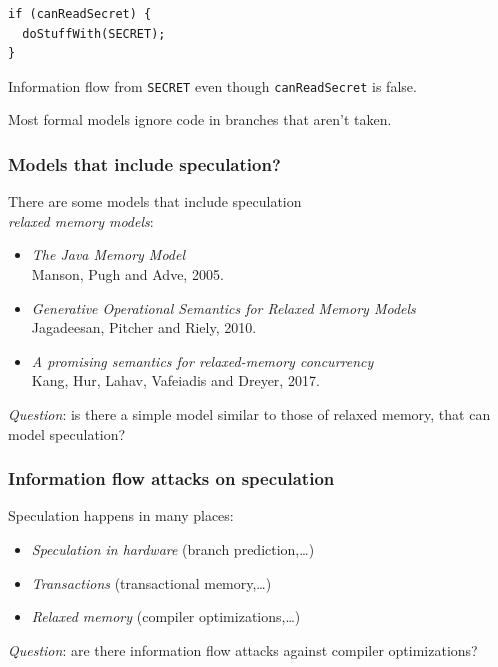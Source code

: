 \documentclass{beamer}
\begin{document}
\begin{frame}[fragile]
\begin{minipage}[b]{.45\textwidth}
\begin{verbatim}
if (canReadSecret) {
  doStuffWith(SECRET);
}
\end{verbatim}

    Information flow from \verb|SECRET|
    even though \verb|canReadSecret| is false.
    \bigskip

    Most formal models ignore code in branches
    that aren't taken.

    \bigskip
  \end{minipage}
\end{frame}

\begin{frame}
  \frametitle{Models that include speculation?}

  There are some models that include speculation\\
  \emph{relaxed memory models}:

  \begin{itemize}\footnotesize
  \item \emph{The Java Memory Model}\\
    Manson, Pugh and Adve, 2005.
  \item \emph{Generative Operational Semantics for Relaxed Memory Models}\\
    Jagadeesan, Pitcher and Riely, 2010.
  \item \emph{A promising semantics for relaxed-memory concurrency}\\
    Kang, Hur, Lahav, Vafeiadis and Dreyer, 2017.
  \end{itemize}

  \pause
  \emph{Question}: is there a simple model similar to
  those of relaxed memory, that can model speculation?
\end{frame}

\begin{frame}
  \frametitle{Information flow attacks on speculation}
  Speculation happens in many places:
  \begin{itemize}\footnotesize
  \item \emph{Speculation in hardware} (branch prediction,\ldots) \\
  \item \emph{Transactions} (transactional memory,\ldots)\\
  \item \emph{Relaxed memory} (compiler optimizations,\ldots)\\
  \end{itemize}
  
  \pause
  \emph{Question}: are there information flow attacks against
  compiler optimizations?
\end{frame}
\end{document}
